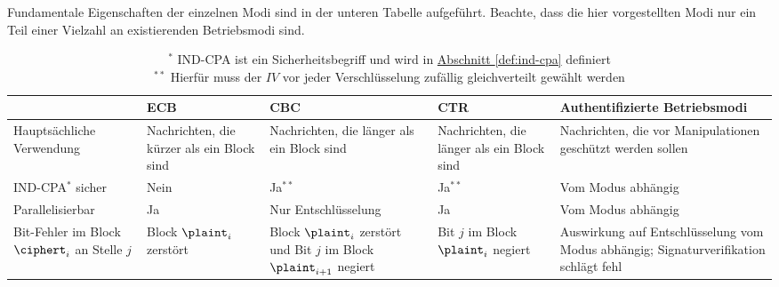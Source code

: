 Fundamentale Eigenschaften der einzelnen Modi sind in der unteren Tabelle aufgeführt. Beachte, dass die hier vorgestellten Modi nur ein Teil einer Vielzahl an existierenden Betriebsmodi sind.
\begin{table}[h]
	\captionsetup{labelformat=empty}
	\captionsetup{singlelinecheck=false}
	\captionsetup{font=footnotesize}
	\centering
	\begin{tabularx}{\textwidth}{ | >{\raggedright\arraybackslash}X | >{\raggedright\arraybackslash}X | >{\raggedright\arraybackslash}X | >{\raggedright\arraybackslash}X | >{\raggedright\arraybackslash}X |} 
		\hline
		& ECB & CBC & CTR & Authentifizierte Betriebsmodi\\ 
		\hline
		Hauptsächliche Verwendung & Nachrichten, die kürzer als ein Block sind & Nachrichten, die länger als ein Block sind
		& Nachrichten, die länger als ein Block sind & Nachrichten, die vor Manipulationen geschützt werden sollen\\ 
		\hline
		\parbox{3cm}{IND-CPA\(^{\ast}\) } sicher & Nein & Ja$^{\ast\ast}$ & Ja$^{\ast\ast}$ & Vom Modus abhängig\\
		\hline
		Parallelisierbar & Ja & Nur Entschlüsselung & Ja & Vom Modus abhängig\\ 
		\hline
		Bit-Fehler im Block $\ciphert_i$ an Stelle $j$ & Block $\plaint_i$ zerstört & Block $\plaint_i$ zerstört und Bit $j$ im Block $\plaint_{i+1}$ negiert 
		& Bit $j$ im Block $\plaint_i$ negiert & Auswirkung auf Entschlüsselung vom Modus abhängig; Signaturverifikation schlägt fehl\\
		\hline
	\end{tabularx}
	\caption{$^{\ast}$ IND-CPA ist ein Sicherheitsbegriff und wird in \hyperref[def:ind-cpa]{Abschnitt \ref{def:ind-cpa}} definiert\\ 
		$^{\ast\ast}$ Hierfür muss der $IV$ vor jeder Verschlüsselung zufällig gleichverteilt gewählt werden}
\end{table}
